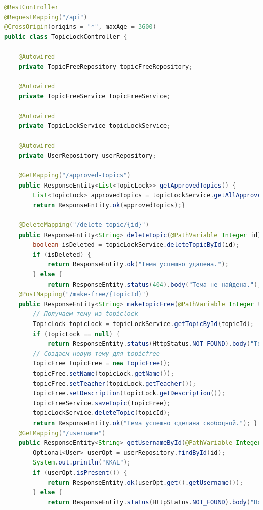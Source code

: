 \documentclass[14pt]{extarticle} %
\begin{document}
\begin{lstlisting}[language=Java, caption={Контроллер занятх тем}]
@RestController
@RequestMapping("/api")
@CrossOrigin(origins = "*", maxAge = 3600)
public class TopicLockController {

    @Autowired
    private TopicFreeRepository topicFreeRepository;

    @Autowired
    private TopicFreeService topicFreeService;

    @Autowired
    private TopicLockService topicLockService;

    @Autowired
    private UserRepository userRepository;

    @GetMapping("/approved-topics")
    public ResponseEntity<List<TopicLock>> getApprovedTopics() {
        List<TopicLock> approvedTopics = topicLockService.getAllApprovedTopics();
        return ResponseEntity.ok(approvedTopics);}

    @DeleteMapping("/delete-topic/{id}")
    public ResponseEntity<String> deleteTopic(@PathVariable Integer id) {
        boolean isDeleted = topicLockService.deleteTopicById(id);
        if (isDeleted) {
            return ResponseEntity.ok("Тема успешно удалена.");
        } else {
            return ResponseEntity.status(404).body("Тема не найдена.");}}
    @PostMapping("/make-free/{topicId}")
    public ResponseEntity<String> makeTopicFree(@PathVariable Integer topicId) {
        // Получаем тему из topiclock
        TopicLock topicLock = topicLockService.getTopicById(topicId);
        if (topicLock == null) {
            return ResponseEntity.status(HttpStatus.NOT_FOUND).body("Тема не найдена.");}
        // Создаем новую тему для topicfree
        TopicFree topicFree = new TopicFree();
        topicFree.setName(topicLock.getName());
        topicFree.setTeacher(topicLock.getTeacher());
        topicFree.setDescription(topicLock.getDescription());
        topicFreeService.saveTopic(topicFree);
        topicLockService.deleteTopic(topicId);
        return ResponseEntity.ok("Тема успешно сделана свободной."); }
    @GetMapping("/username")
    public ResponseEntity<String> getUsernameById(@PathVariable Integer id) {
        Optional<User> userOpt = userRepository.findById(id);
        System.out.println("KKAL");
        if (userOpt.isPresent()) {
            return ResponseEntity.ok(userOpt.get().getUsername());
        } else {
            return ResponseEntity.status(HttpStatus.NOT_FOUND).body("Пользователь не найден");} }}
\end{lstlisting}
\end{document}
